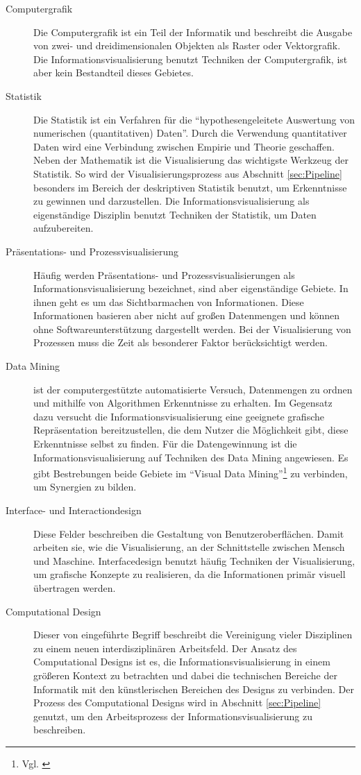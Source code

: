 \documentclass[a4paper, 
               12pt,
               DIV=calc,
               version=first,
               pdftex,
               headsepline,
               footsepline,
               bibtotocnumbered,
               liststotocnumbered]{scrreprt}
\begin{document}
\begin{description}
\item[Computergrafik]
Die Computergrafik ist ein Teil der Informatik und beschreibt die Ausgabe von zwei- und dreidimensionalen
Objekten als Raster oder Vektorgrafik. Die Informationsvisualisierung benutzt Techniken der Computergrafik, ist aber kein
Bestandteil dieses Gebietes.
\item[Statistik]
Die Statistik ist ein Verfahren für die "`hypothesengeleitete Auswertung von numerischen (quantitativen)
Daten"'\citep[S.\,23]{Statistik}. Durch die Verwendung quantitativer Daten wird eine Verbindung zwischen
Empirie und Theorie geschaffen.  Neben der Mathematik ist die Visualisierung das wichtigste
Werkzeug der Statistik. So wird der Visualisierungsprozess aus Abschnitt \ref{sec:Pipeline} besonders
im Bereich der deskriptiven Statistik benutzt, um Erkenntnisse zu gewinnen und darzustellen.
Die Informationsvisualisierung als eigenständige Disziplin benutzt Techniken der Statistik, um Daten aufzubereiten.
\item[Präsentations- und Prozessvisualisierung]
Häufig werden Präsentations- und Prozessvisualisierungen als Informationsvisualisierung bezeichnet, sind
aber eigenständige Gebiete. In ihnen geht es um das Sichtbarmachen von Informationen. Diese Informationen basieren aber nicht auf
großen Datenmengen und können ohne Softwareunterstützung dargestellt werden. Bei der Visualisierung
von Prozessen muss die Zeit als besonderer Faktor berücksichtigt werden.
\item[Data Mining] ist der computergestützte automatisierte Versuch, Datenmengen zu ordnen und mithilfe
von Algorithmen Erkenntnisse zu erhalten. Im Gegensatz dazu versucht die Informationsvisualisierung eine geeignete
grafische Repräsentation
bereitzustellen, die dem Nutzer die Möglichkeit gibt, diese Erkenntnisse selbst zu finden. Für die Datengewinnung
ist die Informationsvisualisierung auf Techniken des Data Mining angewiesen. Es gibt Bestrebungen beide Gebiete 
im "`Visual Data Mining"'\footnote{Vgl. \citep{Keim}} zu verbinden, um Synergien zu bilden.
\item[Interface- und Interactiondesign]
Diese Felder beschreiben die Gestaltung von Benutzeroberflächen. Damit arbeiten sie, wie die Visualisierung, an
der Schnittstelle zwischen Mensch und Maschine. Interfacedesign benutzt häufig Techniken der Visualisierung,
um grafische Konzepte zu realisieren, da die Informationen primär visuell übertragen werden.
\item[Computational Design]
Dieser von \cite{BenFry} eingeführte Begriff beschreibt die Vereinigung vieler Disziplinen zu einem neuen
interdisziplinären Arbeitsfeld. Der Ansatz des Computational Designs ist es, die Informationsvisualisierung in einem größeren
Kontext zu betrachten und dabei die technischen Bereiche der Informatik mit den künstlerischen
Bereichen des Designs zu verbinden. Der Prozess des Computational Designs wird in Abschnitt \ref{sec:Pipeline}
genutzt, um den Arbeitsprozess der Informationsvisualisierung zu beschreiben.
\end{description}
\end{document}
